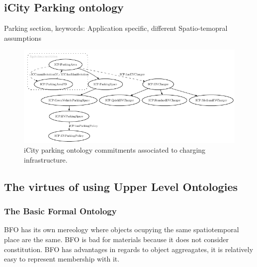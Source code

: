 \subsection{iCity Parking ontology}

Parking section, keywords: Application specific, different Spatio-temopral assumptions

\begin{figure}[h]
    \caption{iCity parking ontology commitments associated to charging infrastructure.}
    \centering
    \includegraphics[width=1.0\textwidth]{images/PARKING}
\end{figure}

\subsection{The virtues of using Upper Level Ontologies}
\label{upperlevel}


\subsubsection{The Basic Formal Ontology}

BFO has its own mereology where objects ocupying the same spatiotemporal place
are the same. BFO is bad for materials because it does not consider constitution.
BFO has advantages in regards to object aggreagates, it is relatively easy to represent
membership with it. 
